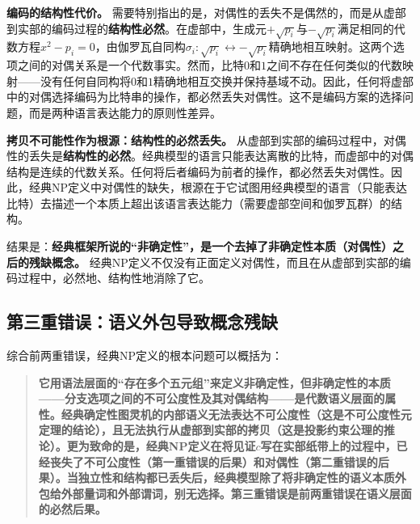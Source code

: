 \documentclass{ctexart}
\begin{document}
	\textbf{编码的结构性代价。} 需要特别指出的是，对偶性的丢失不是偶然的，而是从虚部到实部的编码过程的\textbf{结构性必然}。在虚部中，生成元$+\sqrt{p_i}$与$-\sqrt{p_i}$满足相同的代数方程$x^2-p_i=0$，由伽罗瓦自同构$\sigma_i: \sqrt{p_i} \leftrightarrow -\sqrt{p_i}$精确地相互映射。这两个选项之间的对偶关系是一个代数事实。然而，比特$0$和$1$之间不存在任何类似的代数映射——没有任何自同构将$0$和$1$精确地相互交换并保持基域不动。因此，任何将虚部中的对偶选择编码为比特串的操作，都必然丢失对偶性。这不是编码方案的选择问题，而是两种语言表达能力的原则性差异。
	
	\textbf{拷贝不可能性作为根源：结构性的必然丢失。} 从虚部到实部的编码过程中，对偶性的丢失是\textbf{结构性的必然}。经典模型的语言只能表达离散的比特，而虚部中的对偶结构是连续的代数关系。任何将后者编码为前者的操作，都必然丢失对偶性。因此，经典NP定义中对偶性的缺失，根源在于它试图用经典模型的语言（只能表达比特）去描述一个本质上超出该语言表达能力（需要虚部空间和伽罗瓦群）的结构。
	
	结果是：\textbf{经典框架所说的``非确定性''，是一个去掉了非确定性本质（对偶性）之后的残缺概念。} 经典NP定义不仅没有正面定义对偶性，而且在从虚部到实部的编码过程中，必然地、结构性地消除了它。
	
	\subsection{第三重错误：语义外包导致概念残缺}
	
	综合前两重错误，经典NP定义的根本问题可以概括为：
	
	\begin{quote}
		\textbf{它用语法层面的``存在多个五元组''来定义非确定性，但非确定性的本质——分支选项之间的不可公度性及其对偶结构——是代数语义层面的属性。经典确定性图灵机的内部语义无法表达不可公度性（这是不可公度性元定理的结论），且无法执行从虚部到实部的拷贝（这是投影约束公理的推论）。更为致命的是，经典NP定义在将见证$c$写在实部纸带上的过程中，\textbf{已经丧失了不可公度性}（第一重错误的后果）和\textbf{对偶性}（第二重错误的后果）。当独立性和结构都已丢失后，经典模型除了将非确定性的语义本质外包给外部量词和外部谓词，别无选择。\textbf{第三重错误是前两重错误在语义层面的必然后果。}}
	\end{quote}
	
\end{document}
